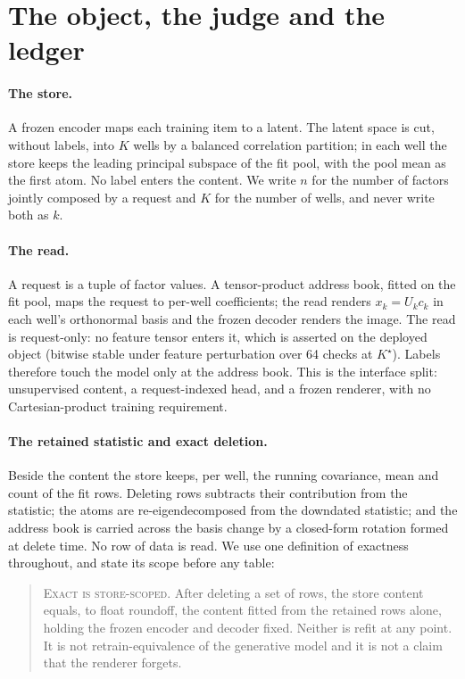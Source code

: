\documentclass{article}
\newcommand{\Kstar}{\ensuremath{K^{\star}}}
\begin{document}
\section{The object, the judge and the ledger}
\label{sec:object}

\paragraph{The store.} A frozen encoder maps each training item to a latent. The latent
space is cut, without labels, into $K$ wells by a balanced correlation partition; in each well
the store keeps the leading principal subspace of the fit pool, with the pool mean as the
first atom. No label enters the content. We write $n$ for the number of factors jointly
composed by a request and $K$ for the number of wells, and never write both as $k$.

\paragraph{The read.} A request is a tuple of factor values. A tensor-product address book,
fitted on the fit pool, maps the request to per-well coefficients; the read renders
$x_k=U_k c_k$ in each well's orthonormal basis and the frozen decoder renders the image. The
read is request-only: no feature tensor enters it, which is asserted on the deployed object
(bitwise stable under feature perturbation over 64 checks at $\Kstar$).
Labels therefore touch the model only at the address book. This is the interface split:
unsupervised content, a request-indexed head, and a frozen renderer, with no Cartesian-product
training requirement.

\paragraph{The retained statistic and exact deletion.} Beside the content the store keeps, per
well, the running covariance, mean and count of the fit rows. Deleting rows subtracts their
contribution from the statistic; the atoms are re-eigendecomposed from the downdated
statistic; and the address book is carried across the basis change by a closed-form rotation
formed at delete time. No row of data is read. We use one definition of exactness throughout,
and state its scope before any table:

\begin{quote}\small
\textsc{Exact is store-scoped.} After deleting a set of rows, the store content equals, to
float roundoff, the content fitted from the retained rows alone, holding the frozen encoder and
decoder fixed. Neither is refit at any point. It is not retrain-equivalence of the generative
model and it is not a claim that the renderer forgets.
\end{quote}
\end{document}
